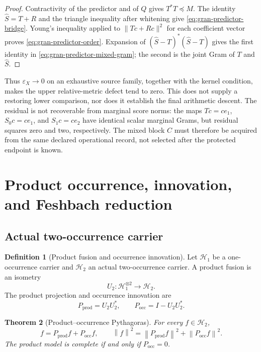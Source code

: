 \documentclass[11pt]{article}
\newtheorem{theorem}{Theorem}[section]
\theoremstyle{definition}
\newtheorem{definition}[theorem]{Definition}
\theoremstyle{remark}
\newcommand{\norm}[1]{\left\lVert#1\right\rVert}
\newcommand{\occ}{\mathrm{occ}}
\newcommand{\prodsec}{\mathrm{prod}}
\begin{document}
\begin{proof}
Contractivity of the predictor and of $Q$ gives $T^*T\preceq M$.
The identity $\widehat S=T+R$ and the triangle inequality after
whitening give \eqref{eq:gran-predictor-bridge}.
Young's inequality applied to $\|Tc+Rc\|^2$ for each coefficient
vector proves \eqref{eq:gran-predictor-order}.
Expansion of $(\widehat S-T)^*(\widehat S-T)$ gives the first
identity in \eqref{eq:gran-predictor-mixed-gram}; the second is the
joint Gram of $T$ and $\widehat S$.
\end{proof}

Thus $\varepsilon_X\to0$ on an exhaustive source family, together
with the kernel condition, makes the upper relative-metric defect tend
to zero.  This does not supply a restoring lower comparison, nor does
it establish the final arithmetic descent.  The residual is not
recoverable from marginal score norms: the maps
$Tc=ce_1$, $S_0c=ce_1$, and $S_1c=ce_2$ have identical scalar
marginal Grams, but residual squares zero and two, respectively.
The mixed block $C$ must therefore be acquired from the same declared
operational record, not selected after the protected endpoint is known.


\section{Product occurrence, innovation, and Feshbach reduction}
\label{sec:gran-occurrence}

\subsection{Actual two-occurrence carrier}

\begin{definition}[Product fusion and occurrence innovation]
Let $\mathcal H_1$ be a one-occurrence carrier and $\mathcal H_2$ an actual
two-occurrence carrier.  A product fusion is an isometry
\[
 U_2:\mathcal H_1^{\otimes2}\longrightarrow\mathcal H_2.
\]
The product projection and occurrence innovation are
\[
 P_{\prodsec}=U_2U_2^*,
 \qquad
 P_{\occ}=I-U_2U_2^*.
\]
\end{definition}

\begin{theorem}[Product--occurrence Pythagoras]
For every $f\in\mathcal H_2$,
\[
 f=P_{\prodsec}f+P_{\occ}f,
 \qquad
 \norm f^2=\norm{P_{\prodsec}f}^2+\norm{P_{\occ}f}^2.
\]
The product model is complete if and only if $P_{\occ}=0$.
\end{theorem}
\end{document}
